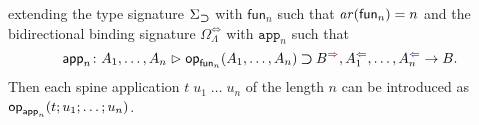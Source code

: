\bgroup
\small
  \centering
  \begin{mathpar}
  \end{mathpar}
\egroup
extending the type signature $\Sigma_{\bto}$ with $\mathsf{fun}_n$ such that $\arity({\mathsf{fun}_n}) = n$ and the bidirectional binding signature $\Omega_{\Lambda}^{\Leftrightarrow}$ with $\mathtt{app}_n$ such that 
\[
  \aritysymbol{\mathsf{app}_n}{A_1,\ldots, A_n}{\tyOp_{\mathsf{fun}_n}(A_1, \ldots, A_n) \bto B^{\syn}, A_1^{\chk}, \ldots, A_n^{\chk}}{B}.
\]
Then each spine application $t\;u_1\;\ldots\;u_n$ of the length $n$ can be introduced as $\tmOp_{\mathsf{app}_n}(t; u_1; \ldots; u_n)$.
